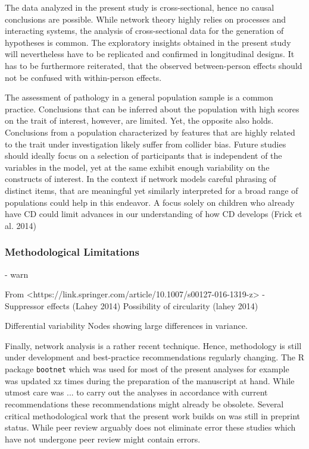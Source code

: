 The data analyzed in the present study is cross-sectional, hence no causal conclusions are possible. 
While network theory highly relies on processes and interacting systems, the analysis of cross-sectional data for the generation of hypotheses is common. 
The exploratory insights obtained in the present study will nevertheless have to be replicated and confirmed in longitudinal designs.
It has to be furthermore reiterated, that the observed between-person effects should not be confused with within-person effects.

The assessment of pathology in a general population sample is a common practice. 
Conclusions that can be inferred about the population with high scores on the trait of interest, however, are limited.
Yet, the opposite also holds. Conclusions from a population characterized by features that are highly related to the trait under investigation likely suffer from collider bias. 
Future studies should ideally focus on a selection of participants that is independent of the variables in the model, yet at the same exhibit enough variability on the constructs of interest. 
In the context if network models careful phrasing of distinct items, that are meaningful yet similarly interpreted for a broad range of populations could help in this endeavor.
A focus solely on children who already have CD could limit advances in our understanding of how CD develops (Frick et al. 2014) \parencite{frick_can_2014}

\subsubsection{Methodological Limitations}
	- warn 

From <https://link.springer.com/article/10.1007/s00127-016-1319-z> 
- Suppressor effects (Lahey 2014)\parencite{lahey_what_2014}
Possibility of circularity (lahey 2014) 
 
 Differential variability \parencite{terluin_differences_2016}
 Nodes showing large differences in variance.
 
  Finally, network analysis is a rather recent technique. 
 Hence, methodology is still under development and best-practice recommendations regularly changing.
 The R package \texttt{bootnet} which was used for most of the present analyses for example was updated xz times
 during the preparation of the manuscript at hand. 
 While utmost care was ... to carry out the analyses in accordance with current recommendations these 
 recommendations might already be obsolete. Several critical methodological work that the present work builds 
 on was still in preprint status. While peer review arguably does not eliminate error these studies which have not undergone peer review might contain errors.
 
